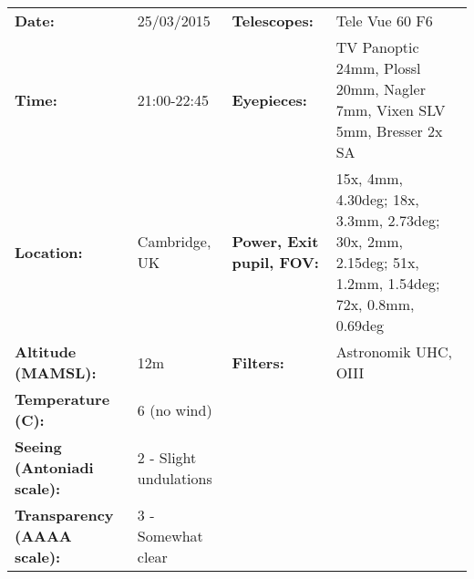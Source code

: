 \begin{tabular}{ p{1.7in} p{1.2in} p{1.5in} p{4.2in}}
{\bf Date:} & 25/03/2015 & {\bf Telescopes:} & Tele Vue 60 F6 \\ 
{\bf Time:} & 21:00-22:45 & {\bf Eyepieces:} & TV Panoptic 24mm, Plossl 20mm, Nagler 7mm, Vixen SLV 5mm, Bresser 2x SA \\ 
{\bf Location:} & Cambridge, UK & {\bf Power, Exit pupil, FOV:} & 15x, 4mm, 4.30deg; 18x, 3.3mm, 2.73deg; 30x, 2mm, 2.15deg; 51x, 1.2mm, 1.54deg; 72x, 0.8mm, 0.69deg \\ 
{\bf Altitude (MAMSL):} & 12m & {\bf Filters:} & Astronomik UHC, OIII \\ 
{\bf Temperature (C):} & 6 (no wind) & & \\ 
{\bf Seeing (Antoniadi scale):} & 2 - Slight undulations & & \\ 
{\bf Transparency (AAAA scale):} & 3 - Somewhat clear & & \\ 
\end{tabular}
\centering 
